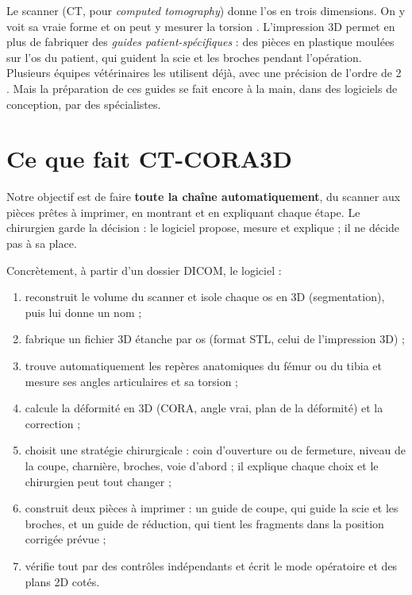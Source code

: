 Le scanner (CT, pour \emph{computed tomography}) donne l'os en trois dimensions. On y voit sa vraie forme et on peut
y mesurer la torsion \cite{dudley2006,alaiyan2021}. L'impression 3D permet en plus de fabriquer des \emph{guides
patient-spécifiques} : des pièces en plastique moulées sur l'os du patient, qui guident la scie et les broches pendant
l'opération. Plusieurs équipes vétérinaires les utilisent déjà, avec une précision de l'ordre de 2\degre{}
\cite{hall2019,jeon2023,bright2024}. Mais la préparation de ces guides se fait encore à la main, dans des logiciels de
conception, par des spécialistes.

\section{Ce que fait CT-CORA3D}

Notre objectif est de faire \textbf{toute la chaîne automatiquement}, du scanner aux pièces prêtes à imprimer, en
montrant et en expliquant chaque étape. Le chirurgien garde la décision : le logiciel propose, mesure et explique ; il
ne décide pas à sa place.


Concrètement, à partir d'un dossier DICOM, le logiciel :
\begin{enumerate}
  \item reconstruit le volume du scanner et isole chaque os en 3D (segmentation), puis lui donne un nom ;
  \item fabrique un fichier 3D étanche par os (format STL, celui de l'impression 3D) ;
  \item trouve automatiquement les repères anatomiques du fémur ou du tibia et mesure ses angles articulaires et sa
  torsion ;
  \item calcule la déformité en 3D (CORA, angle vrai, plan de la déformité) et la correction ;
  \item choisit une stratégie chirurgicale : coin d'ouverture ou de fermeture, niveau de la coupe, charnière, broches,
  voie d'abord ; il explique chaque choix et le chirurgien peut tout changer ;
  \item construit deux pièces à imprimer : un guide de coupe, qui guide la scie et les broches, et un guide de
  réduction, qui tient les fragments dans la position corrigée prévue ;
  \item vérifie tout par des contrôles indépendants et écrit le mode opératoire et des plans 2D cotés.
\end{enumerate}

